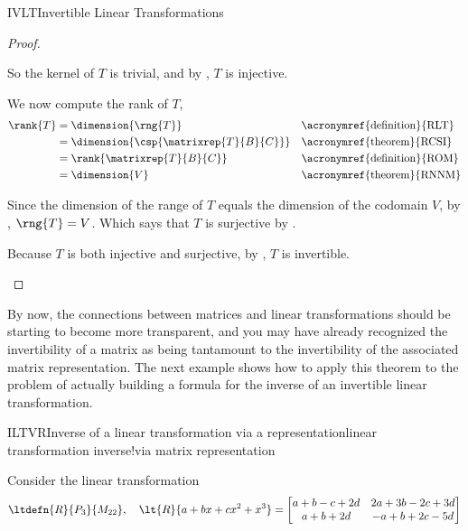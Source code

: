 \begin{subsect}{IVLT}{Invertible Linear Transformations}
\begin{proof}
%
\begin{para}So the kernel of $T$ is trivial, and by , $T$ is injective.\end{para}
%
\begin{para}We now compute the rank of $T$,
%
\begin{align*}
\rank{T}
&=\dimension{\rng{T}}
&&\text{\acronymref{definition}{RLT}}\\
%
&=\dimension{\csp{\matrixrep{T}{B}{C}}}
&&\text{\acronymref{theorem}{RCSI}}\\
%
&=\rank{\matrixrep{T}{B}{C}}
&&\text{\acronymref{definition}{ROM}}\\
%
&=\dimension{V}
&&\text{\acronymref{theorem}{RNNM}}
%
\end{align*}
\end{para}
%
\begin{para}Since the dimension of the range of $T$ equals the dimension of the codomain $V$, by , $\rng{T}=V$.  Which says that $T$ is surjective by .\end{para}
%
\begin{para}Because $T$ is both injective and surjective, by , $T$ is invertible.\end{para}
%
\end{proof}
%
\begin{para}By now, the connections between matrices and linear transformations should be starting to become more transparent, and you may have already recognized the invertibility of a matrix as being  tantamount to the invertibility of the associated matrix representation.  The next example shows how to apply this theorem to the problem of actually building a formula for the inverse of an invertible linear transformation.\end{para}
%
\begin{example}{ILTVR}{Inverse of a linear transformation via a representation}{linear transformation inverse!via matrix representation}
\begin{para}Consider the linear transformation
%
\begin{equation*}
\ltdefn{R}{P_3}{M_{22}},\quad
\lt{R}{a+bx+cx^2+x^3}=
\begin{bmatrix}
a +b - c + 2d & 2a + 3b - 2c + 3d\\
a + b + 2 d & -a + b + 2c - 5d
\end{bmatrix}
\end{equation*}
\end{para}

\end{example}
\end{subsect}
